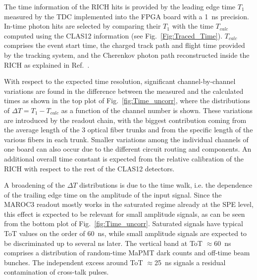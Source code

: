 \documentclass[5p,times,twocolumn]{elsarticle}
\def\MaPMT{MaPMT }
\begin{document}
The time information of the RICH hits is provided by the leading edge time $T_1$ measured by the TDC implemented
into the FPGA board with a 1~ns precision. In-time photon hits are selected by comparing their $T_1$ with the time
$T_{calc}$ computed using the CLAS12 information (see Fig.~\ref{Fig:Traced_Time}). $T_{calc}$ comprises the event
start time, the charged track path and flight time provided by the tracking system, and the Cherenkov photon path
reconstructed inside the RICH as explained in Ref.~\cite{recon-nim}. 

With respect to the expected time resolution, significant channel-by-channel variations are found in the difference
between the measured and the calculated times as shown in the top plot of Fig.~\ref{fig:Time_uncorr}, where the
distributions of $\Delta T=T_1-T_{calc}$ as a function of the channel number is shown. These variations are introduced
by the readout chain, with the biggest contribution coming from the average length of the 3 optical fiber trunks and
from the specific length of the various fibers in each trunk. Smaller variations among the individual channels of one
board can also occur due to the different circuit routing and components. An additional overall time constant is
expected from the relative calibration of the RICH with respect to the rest of the CLAS12 detectors.

A broadening of the $\Delta T$ distributions is due to the time walk, i.e. the dependence of the trailing edge time
on the amplitude of the input signal. Since the MAROC3 readout mostly works in the saturated regime already
at the SPE level, this effect is expected to be relevant for small amplitude signals, as can be seen from the bottom
plot of Fig.~\ref{fig:Time_uncorr}. Saturated signals have typical ToT values on the order of 60~ns, while small
amplitude signals are expected to be discriminated up to several ns later. The vertical band at ToT $\approx$60~ns
comprises a distribution of random-time \MaPMT dark counts and off-time beam bunches. The independent excess
around ToT $\approx$25~ns signals a residual contamination of cross-talk pulses.

\end{document}
